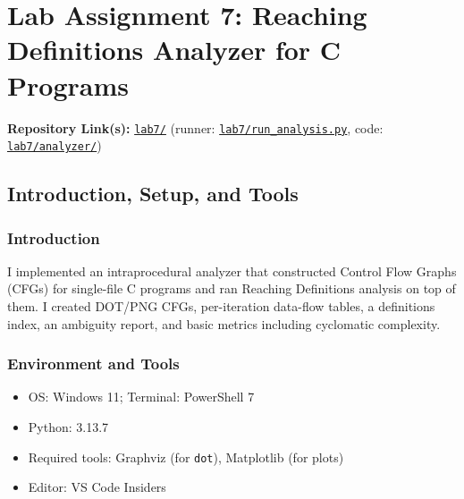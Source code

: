 \section{Lab Assignment 7: Reaching Definitions Analyzer for C Programs}



\vspace{0.5em}
\textbf{Repository Link(s):} \href{https://github.com/ShardulJunagade/cs202-stt/tree/main/lab7/}{\texttt{lab7/}} \space (runner: \href{https://github.com/ShardulJunagade/cs202-stt/tree/main/lab7/run\_analysis.py}{\texttt{lab7/run\_analysis.py}}, code: \href{https://github.com/ShardulJunagade/cs202-stt/tree/main/lab7/analyzer/}{\texttt{lab7/analyzer/}})


\subsection{Introduction, Setup, and Tools}

\subsubsection{Introduction}
I implemented an intraprocedural analyzer that constructed Control Flow Graphs (CFGs) for single-file C programs and ran Reaching Definitions analysis on top of them. I created DOT/PNG CFGs, per-iteration data-flow tables, a definitions index, an ambiguity report, and basic metrics including cyclomatic complexity.

\subsubsection{Environment and Tools}
\begin{itemize}[itemsep=0em, topsep=0pt]
    \item OS: Windows 11; Terminal: PowerShell 7
    \item Python: 3.13.7
    \item Required tools: Graphviz (for \texttt{dot}), Matplotlib (for plots)
    \item Editor: VS Code Insiders
\end{itemize}

